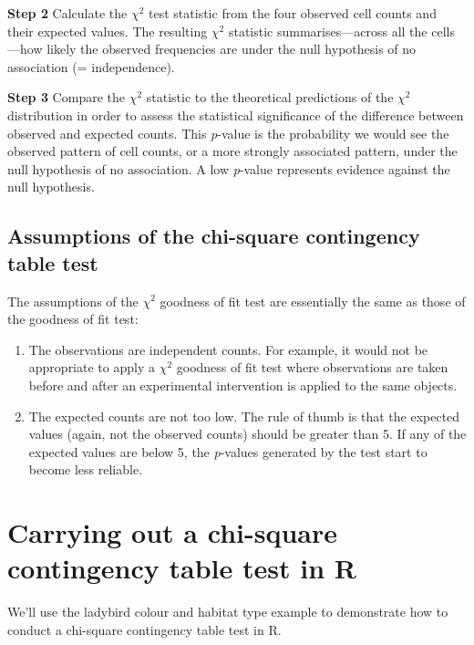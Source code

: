 \documentclass[
]{book}
\begin{document}
\textbf{Step 2} Calculate the \(\chi^{2}\) test statistic from the four observed cell counts and their expected values. The resulting \(\chi^{2}\) statistic summarises---across all the cells---how likely the observed frequencies are under the null hypothesis of no association (= independence).

\textbf{Step 3} Compare the \(\chi^{2}\) statistic to the theoretical predictions of the \(\chi^{2}\) distribution in order to assess the statistical significance of the difference between observed and expected counts. This \emph{p}-value is the probability we would see the observed pattern of cell counts, or a more strongly associated pattern, under the null hypothesis of no association. A low \emph{p}-value represents evidence against the null hypothesis.

\hypertarget{assumptions-of-the-chi-square-contingency-table-test}{%
\subsection{Assumptions of the chi-square contingency table test}\label{assumptions-of-the-chi-square-contingency-table-test}}

The assumptions of the \(\chi^{2}\) goodness of fit test are essentially the same as those of the goodness of fit test:

\begin{enumerate}
\def\labelenumi{\arabic{enumi}.}
\item
  The observations are independent counts. For example, it would not be appropriate to apply a \(\chi^{2}\) goodness of fit test where observations are taken before and after an experimental intervention is applied to the same objects.
\item
  The expected counts are not too low. The rule of thumb is that the expected values (again, not the observed counts) should be greater than 5. If any of the expected values are below 5, the \emph{p}-values generated by the test start to become less reliable.
\end{enumerate}

\hypertarget{carrying-out-a-chi-square-contingency-table-test-in-r}{%
\section{Carrying out a chi-square contingency table test in R}\label{carrying-out-a-chi-square-contingency-table-test-in-r}}

We'll use the ladybird colour and habitat type example to demonstrate how to conduct a chi-square contingency table test in R.
\end{document}
